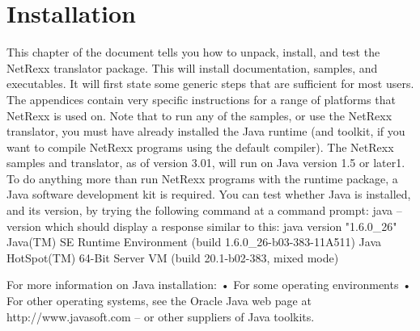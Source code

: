 \chapter{Installation}
This chapter of the document tells you how to unpack, install, and test the NetRexx translator package. This will install documentation, samples, and executables. It will first state some generic steps that are sufficient for most users. The appendices contain very specific instructions for a range of platforms that NetRexx is used on. 
Note that to run any of the samples, or use the NetRexx translator, you must have already installed the Java runtime (and toolkit, if you want to compile NetRexx programs using the default compiler). 
The NetRexx samples and translator, as of version 3.01, will run on 
Java version 1.5 or later1. To do anything more than run NetRexx programs with the runtime package, a Java software development kit is required. You can test whether Java is installed, and its version, by trying the following command at a command prompt: 
    java –version
which should display a response similar to this: 
java version "1.6.0\_26"
Java(TM) SE Runtime Environment (build 1.6.0\_26-b03-383-11A511)
Java HotSpot(TM) 64-Bit Server VM (build 20.1-b02-383, mixed mode)

For more information on Java installation: 
• For some operating environments
• For other operating systems, see the Oracle Java web page at http://www.javasoft.com – or other suppliers of Java toolkits. 